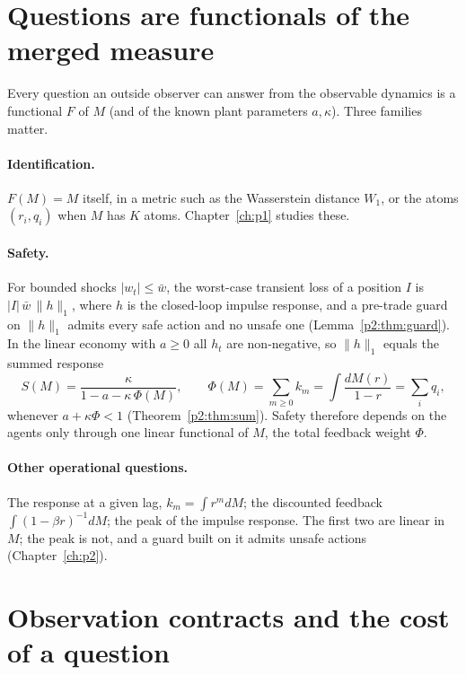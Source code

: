 \section{Questions are functionals of the merged measure}\label{sec:fw_questions}

Every question an outside observer can answer from the observable dynamics is a functional $F$ of $M$ (and of the known plant parameters $a,\kappa$). Three families matter.

\paragraph{Identification.} $F(M)=M$ itself, in a metric such as the Wasserstein distance $W_1$, or the atoms $(r_i,q_i)$ when $M$ has $K$ atoms. Chapter~\ref{ch:p1} studies these.

\paragraph{Safety.} For bounded shocks $|w_t|\le\bar w$, the worst-case transient loss of a position $I$ is $|I|\,\bar w\,\|h\|_1$, where $h$ is the closed-loop impulse response, and a pre-trade guard on $\|h\|_1$ admits every safe action and no unsafe one (Lemma~\ref{p2:thm:guard}). In the linear economy with $a\ge0$ all $h_t$ are non-negative, so $\|h\|_1$ equals the summed response
\begin{equation}\label{eq:fw_S}
S(M)=\frac{\kappa}{1-a-\kappa\,\Phi(M)},\qquad \Phi(M)=\sum_{m\ge0}k_m=\int\frac{dM(r)}{1-r}=\sum_i q_i ,
\end{equation}
whenever $a+\kappa\Phi<1$ (Theorem~\ref{p2:thm:sum}). Safety therefore depends on the agents only through one linear functional of $M$, the total feedback weight $\Phi$.

\paragraph{Other operational questions.} The response at a given lag, $k_m=\int r^m dM$; the discounted feedback $\int (1-\beta r)^{-1}dM$; the peak of the impulse response. The first two are linear in $M$; the peak is not, and a guard built on it admits unsafe actions (Chapter~\ref{ch:p2}).

\section{Observation contracts and the cost of a question}\label{sec:fw_contracts}

